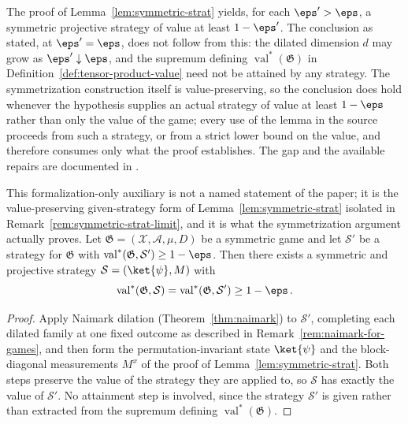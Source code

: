 \begin{remark}\label{rem:symmetric-strat-limit}
	The proof of Lemma~\ref{lem:symmetric-strat} yields, for each $\eps' > \eps$, a symmetric projective strategy of value at least $1-\eps'$. The conclusion as stated, at $\eps' = \eps$, does not follow from this: the dilated dimension $d$ may grow as $\eps' \downarrow \eps$, and the supremum defining $\operatorname{val}^*(\mathfrak G)$ in Definition~\ref{def:tensor-product-value} need not be attained by any strategy. The symmetrization construction itself is value-preserving, so the conclusion does hold whenever the hypothesis supplies an actual strategy of value at least $1-\eps$ rather than only the value of the game; every use of the lemma in the source proceeds from such a strategy, or from a strict lower bound on the value, and therefore consumes only what the proof establishes. The gap and the available repairs are documented in \cite{gap:qpbt_symmetrization-attainment}.
\end{remark}

\begin{lemma}
	\label{lem:symmetric-strat-given-strategy}
	\leanok
	This formalization-only auxiliary is not a named statement of the paper; it is the value-preserving given-strategy form of Lemma~\ref{lem:symmetric-strat} isolated in Remark~\ref{rem:symmetric-strat-limit}, and it is what the symmetrization argument actually proves. Let $\mathfrak G = (\mathcal X, \mathcal A, \mu, D)$ be a symmetric game and let $\mathcal S'$ be a strategy for $\mathfrak G$ with $\operatorname{val}^*(\mathfrak G, \mathcal S') \ge 1-\eps$. Then there exists a symmetric and projective strategy $\mathcal S = (\ket{\psi}, M)$ with
	\[
		\operatorname{val}^*(\mathfrak G, \mathcal S) = \operatorname{val}^*(\mathfrak G, \mathcal S') \ge 1-\eps\,.
	\]
\end{lemma}
\begin{proof}
	\leanok
	Apply Naimark dilation (Theorem~\ref{thm:naimark}) to $\mathcal S'$, completing each dilated family at one fixed outcome as described in Remark~\ref{rem:naimark-for-games}, and then form the permutation-invariant state $\ket{\psi}$ and the block-diagonal measurements $M^x$ of the proof of Lemma~\ref{lem:symmetric-strat}. Both steps preserve the value of the strategy they are applied to, so $\mathcal S$ has exactly the value of $\mathcal S'$. No attainment step is involved, since the strategy $\mathcal S'$ is given rather than extracted from the supremum defining $\operatorname{val}^*(\mathfrak G)$.
\end{proof}

